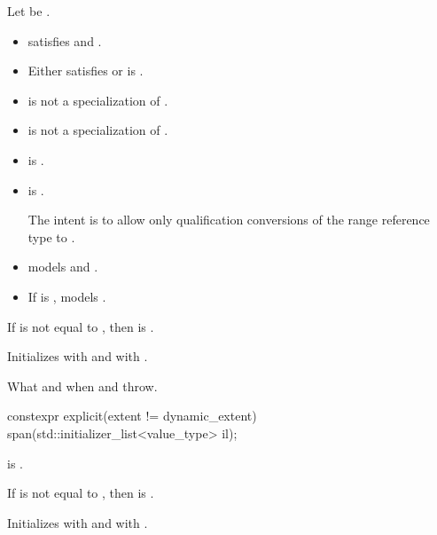 \begin{itemdescr}
\pnum
\constraints
Let  be .
\begin{itemize}
\item {} satisfies  and
  .
\item Either  satisfies  or
 is .
\item {} is not a specialization of .
\item {} is not a specialization of .
\item {} is .
\item
{} is .
\begin{note}
The intent is to allow only qualification conversions
of the range reference type to .
\end{note}
\end{itemize}

\pnum
\expects
\begin{itemize}
\item {} models  and
.
\item If  is ,
 models .
\end{itemize}

\pnum
\hardexpects
If  is not equal to ,
then  is .

\pnum
\effects
Initializes  with  and
 with .

\pnum
\throws
What and when  and  throw.
\end{itemdescr}

%
\begin{itemdecl}
constexpr explicit(extent != dynamic_extent) span(std::initializer_list<value_type> il);
\end{itemdecl}

\begin{itemdescr}
\pnum
\constraints
{} is .

\pnum
\hardexpects
If  is not equal to ,
then  is .

\pnum
\effects
Initializes  with  and
 with .
\end{itemdescr}


